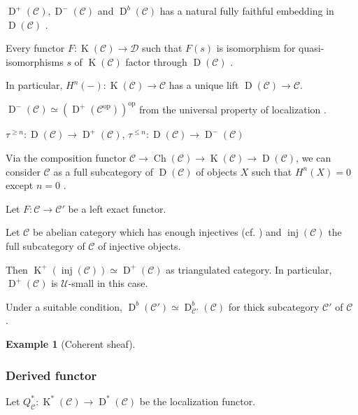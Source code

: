 \documentclass[a4paper,dvipdfmx,reqno,12pt]{amsart}
\theoremstyle{definition}
\newtheorem{Eg}[Thm]{Example}
\newcommand{\mcal}[1]{\mathcal{#1}}%
\newcommand{\opn}[1]{\operatorname{#1}}
\numberwithin{equation}{section}
\begin{document}
$\opn{D}^{+}(\mcal{C}), \opn{D}^{-}(\mcal{C})$ and $\opn{D}^{b}(\mcal{C})$ has a natural fully faithful embedding in $\opn{D}(\mcal{C})$ \cite[Proposition 1.7.2 (i)]{MR1299726}.

Every functor $F: \opn{K}(\mcal{C})\to \mcal{D}$ such that $F(s)$ is isomorphism for quasi-isomorphisms $s$ of $\opn{K}(\mcal{C})$ factor through $\opn{D}(\mcal{C})$ \cite[Proposition 1.6.3]{MR1299726}.

In particular, $H^{n}(-):\opn{K}(\mcal{C})\to \mcal{C}$ has a unique lift $\opn{D}(\mcal{C})\to \mcal{C}$.

$\opn{D}^{-}(\mcal{C})\simeq (\opn{D}^{+}(\mcal{C}^{\opn{op}}))^{\opn{op}}$ from the universal property of localization \cite[Remark 1.6.4]{MR1299726}.

$\tau^{\geq n}:\opn{D}(\mcal{C})\to \opn{D}^{+}(\mcal{C})$, $\tau^{\leq n}:\opn{D}(\mcal{C})\to \opn{D}^{-}(\mcal{C})$



Via the composition functor $\mcal{C}\to \opn{Ch}(\mcal{C})\to \opn{K}(\mcal{C}) \to \opn{D}(\mcal{C})$, we can consider $\mcal{C}$ as a full subcategory of $\opn{D}(\mcal{C})$ of objects $X$ such that $H^{n}(X)=0$ except $n=0$ \cite[Proposition 1.7.2 (ii)]{MR1299726}.

Let $F:\mcal{C}\to \mcal{C}'$ be a left exact functor.
\cite[Definition 1.8.2, Remark 1.8.5]{}

Let $\mcal{C}$ be abelian category which has enough injectives (cf. \cite[Definition 1.7.9]{MR1299726}) and $\opn{inj}(\mcal{C})$ the full subcategory of $\mcal{C}$ of injective objects.

Then $\opn{K}^{+}(\opn{inj}(\mcal{C}))\simeq \opn{D}^{+}(\mcal{C})$ \cite[Proposition 1.7.10]{MR1299726} as triangulated category. In particular, $\opn{D}^{+}(\mcal{C})$ is $\mcal{U}$-small in this case.

Under a suitable condition, $\opn{D}^{b}(\mcal{C}')\simeq \opn{D}_{\mcal{C}'}^{b}(\mcal{C})$ for thick subcategory $\mcal{C}'$ of $\mcal{C}$ \cite[Remark 1.7.12]{}.

\begin{Eg}[Coherent sheaf]

\end{Eg}
\subsubsection{Derived functor}
Let $Q_{\mcal{C}}^{*}:\opn{K}^{*}(\mcal{C}) \to \opn{D}^{*}(\mcal{C})$ be the localization functor.
\end{document}
